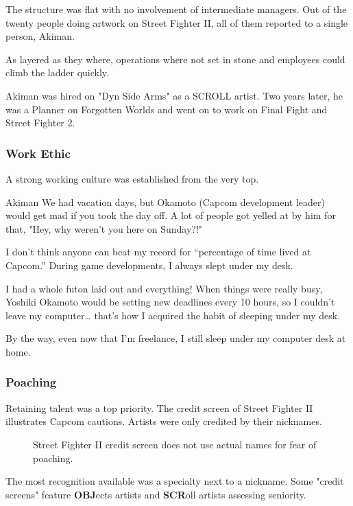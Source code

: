 The structure was flat with no involvement of intermediate managers. Out of the twenty people doing artwork on Street Fighter II, all of them reported to a single person, Akiman\cite{sf2_oral_history}.




As layered as they where, operations where not set in stone and employees could climb the ladder quickly. 

Akiman was hired on "Dyn Side Arms" as a SCROLL artist. Two years later, he was a Planner on Forgotten Worlds and went on to work on Final Fight and Street Fighter 2.

\subsubsection{Work Ethic}

A strong working culture was established from the very top.

\begin{q}{Akiman\cite{akiman2003}}
  We had vacation days, but Okamoto (Capcom development leader) would get mad if you took the day off. A lot of people got yelled at by him for that, "Hey, why weren’t you here on Sunday?!"

  I don’t think anyone can beat my record for “percentage of time lived at Capcom.” During game developments, I always slept under my desk. 

  I had a whole futon laid out and everything! When things were really busy, Yoshiki Okamoto  would be setting new deadlines every 10 hours, so I couldn't leave my computer… that's how I acquired the habit of sleeping under my desk. 

  By the way, even now that I'm freelance, I still sleep under my computer desk at home.
  \end{q}

\subsubsection{Poaching}


Retaining talent was a top priority. The credit screen of Street Fighter II illustrates Capcom cautions. Artists were only credited by their nicknames.

 \begin{figure}[H]
\caption*{Street Fighter II credit screen does not use actual names for fear of poaching.}
\end{figure}

\begin{trivia}
The most recognition available was a specialty next to a nickname. Some "credit screens" feature \textbf{OBJ}ects artists and \textbf{SCR}oll artists assessing seniority.
\end{trivia}

